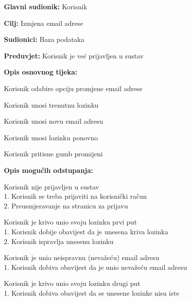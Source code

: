 					\noindent {}
					\begin{packed_item}
						\item \textbf{Glavni sudionik:} Korisnik
						\item \textbf{Cilj:} Izmjena email adrese
						\item \textbf{Sudionici:} Baza podataka
						\item \textbf{Preduvjet:} Korisnik je već prijavljen u sustav
						\item \textbf{Opis osnovnog tijeka:}
						\begin{packed_enum}
							\item Korisnik odabire opciju promjene email adrese
							\item Korisnik unosi trenutnu lozinku
							\item Korisnik unosi novu email adresu
							\item Korisnik unosi lozinku ponovno
							\item Korisnik pritisne gumb promijeni
						\end{packed_enum}
						\item \textbf{Opis mogućih odstupanja:}
						\begin{packed_item}
							\item [1.a] Korisnik nije prijavljen u sustav
							\\1. Korisnik se treba prijaviti na korisnički račun
							\\2. Preusmjeravanje na stranicu za prijavu
							\item [2.a] Korisnik je krivo unio svoju lozinku prvi put
							\\1. Korisnik dobije obavijest da je unesena kriva lozinka
							\\2. Korisnik ispravlja unesenu lozinku
							\item [3.a] Korisnik je unio neispravnu (nevažeću) email adresu
							\\1. Korisnik dobiva obavijest da je unio nevažeću email adresu
							\item [4.a] Korisnik je krivo unio svoju lozinku drugi put
							\\1. Korisnik dobiva obavijest da se unesene lozinke nisu iste
						\end{packed_item}
					\end{packed_item}

